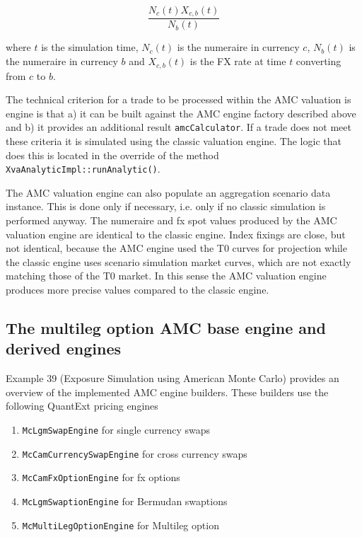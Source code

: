 \begin{equation}\label{currency_conversion_factor}
\frac{N_c(t) X_{c,b}(t)}{N_b(t)}
\end{equation}

where $t$ is the simulation time, $N_c(t)$ is the numeraire in currency $c$, $N_b(t)$ is the numeraire in currency
$b$ and $X_{c,b}(t)$ is the FX rate at time $t$ converting from $c$ to $b$.

The technical criterion for a trade to be processed within the AMC valuation is engine is that a) it can be built
against the AMC engine factory described above and b) it provides an additional result \verb+amcCalculator+. If a trade
does not meet these criteria it is simulated using the classic valuation engine. The logic that does this is located in
the override of the method \verb+XvaAnalyticImpl::runAnalytic()+.

The AMC valuation engine can also populate an aggregation scenario data instance. This is done only if necessary,
i.e. only if no classic simulation is performed anyway. The numeraire and fx spot values produced by the AMC valuation
engine are identical to the classic engine. Index fixings are close, but not identical, because the AMC engine used the
T0 curves for projection while the classic engine uses scenario simulation market curves, which are not exactly matching
those of the T0 market. In this sense the AMC valuation engine produces more precise values compared to the classic
engine.

\subsection{The multileg option AMC base engine and derived engines}\label{sec:amc_base_engine}

Example 39 (Exposure Simulation using American Monte Carlo) provides an overview of the implemented AMC engine builders.
These builders use the following QuantExt pricing engines

\begin{enumerate}
\item \verb+McLgmSwapEngine+ for single currency swaps
\item \verb+McCamCurrencySwapEngine+ for cross currency swaps
\item \verb+McCamFxOptionEngine+ for fx options
\item \verb+McLgmSwaptionEngine+ for Bermudan swaptions
\item \verb+McMultiLegOptionEngine+ for Multileg option
\end{enumerate}

